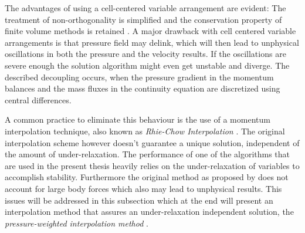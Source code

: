   The advantages of using a cell-centered variable arrangement are evident: The treatment of non-orthogonality is simplified and the conservation property of finite volume methods is retained \cite{choi99,majumdar88,miller88,zhang14}. A major drawback with cell centered variable arrangements is that pressure field may delink, which will then lead to unphysical oscillations in both the pressure and the velocity results. If the oscillations are severe enough the solution algorithm might even get unstable and diverge. The described decoupling occurs, when the pressure gradient in the momentum balances and the mass fluxes in the continuity equation are discretized using central differences. 
  
  A common practice to eliminate this behaviour is the use of a momentum interpolation technique, also known as \emph{Rhie-Chow Interpolation} \cite{rhie82}. The original interpolation scheme however doesn't guarantee a unique solution, independent of the amount of under-relaxation. The performance of one of the algorithms that are used in the present thesis heavily relies on the under-relaxation of variables to accomplish stability. Furthermore the original method as proposed by \cite{rhie82} does not account for large body forces which also may lead to unphysical results. This issues will be addressed in this subsection which at the end will present an interpolation method that assures an under-relaxation independent solution, the \emph{pressure-weighted interpolation method} \cite{miller88}.

